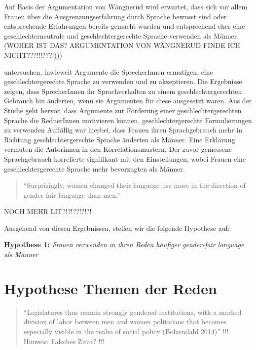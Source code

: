 \documentclass[12pt, 
    twoside=false, 
    bibliography=totoc, 
    numbers=endperiod, 
    headings=normal, 
    toc=chapterentrydotfill
    ]{scrbook}
\begin{document}
Auf Basis der Argumentation von Wängnerud \parencites*{wangnerud_2000}{wangnerud_2009} wird erwartet, dass sich vor allem Frauen über die Ausgrenzungserfahrung durch Sprache bewusst sind oder entsprechende Erfahrungen bereits gemacht wurden und entsprechend eher eine geschlechterneutrale und geschlechtergerechte Sprache verwenden als Männer.  (WOHER IST DAS? ARGUMENTATION VON WÄNGNERUD FINDE ICH NICHT???!!!???!))) 

\textcite{koeser_2014} untersuchen, inwieweit Argumente die SprecherInnen ermutigen, eine geschlechtergerechte Sprache zu verwenden und zu akzeptieren. Die Ergebnisse zeigen, dass SprecherInnen ihr Sprachverhalten zu einem geschlechtergerechten Gebrauch hin änderten, wenn sie Argumenten für diese ausgesetzt waren. Aus der Studie geht hervor, dass Argumente zur Förderung einer geschlechtergerechten Sprache die RednerInnen motivieren können, geschlechtergerechte Formulierungen zu verwenden \parencite[548]{koeser_2014} Auffällig war hierbei, dass Frauen ihren Sprachgebrauch mehr in Richtung geschlechtergerechte Sprache änderten als Männer. Eine Erklärung vermuten die Autorinnen in den Korrelationsmustern. Der zuvor gemessene Sprachgebrauch korrelierte signifikant mit den Einstellungen, wobei Frauen eine geschlechtergerechte Sprache mehr bevorzugten als Männer\parencite[555]{koeser_2014}.

\begin{quote}
    \enquote {Surprisingly, women changed their
language use more in the direction of gender-fair language than men.} \parencite[555]{koeser_2014}
\end{quote}


NOCH MEHR LIT?!?!??!?!?!

Ausgehend von diesen Ergebnissen, stellen wir die folgende Hypothese auf: 


\textbf{Hypothese 1:} \emph{Frauen verwenden in ihren Reden häufiger gender-fair language als Männer}



\section{Hypothese Themen der Reden}

\begin{quote}
    “Legislatures thus remain strongly gendered institutions, with a marked division of labor between men and women politicians that becomes especially visible in the realm of social policy (Bolzendahl 2014)” \parencite[250]{ennser-jedenastik_2017} !!! Hinweis: Falsches Zitat? !!!
\end{quote}
\end{document}
